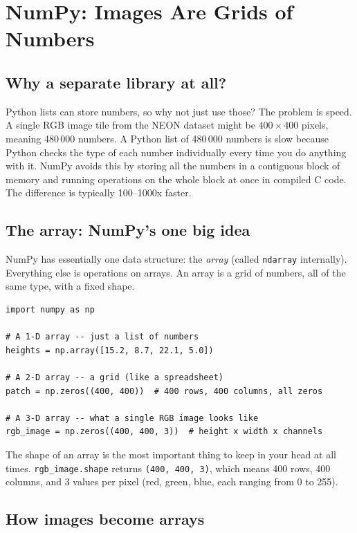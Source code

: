 \documentclass[11pt, a4paper]{article}
\begin{document}
\section{NumPy: Images Are Grids of Numbers}

\subsection{Why a separate library at all?}

Python lists can store numbers, so why not just use those? The problem is
speed. A single RGB image tile from the NEON dataset might be $400 \times 400$
pixels, meaning 480\,000 numbers. A Python list of 480\,000 numbers is slow
because Python checks the type of each number individually every time you do
anything with it. NumPy avoids this by storing all the numbers in a contiguous
block of memory and running operations on the whole block at once in compiled C
code. The difference is typically 100--1000x faster.

\subsection{The array: NumPy's one big idea}

NumPy has essentially one data structure: the \emph{array} (called
\lstinline{ndarray} internally). Everything else is operations on arrays. An
array is a grid of numbers, all of the same type, with a fixed shape.

\begin{lstlisting}
import numpy as np

# A 1-D array -- just a list of numbers
heights = np.array([15.2, 8.7, 22.1, 5.0])

# A 2-D array -- a grid (like a spreadsheet)
patch = np.zeros((400, 400))  # 400 rows, 400 columns, all zeros

# A 3-D array -- what a single RGB image looks like
rgb_image = np.zeros((400, 400, 3))  # height x width x channels
\end{lstlisting}

The shape of an array is the most important thing to keep in your head at all
times. \lstinline{rgb_image.shape} returns \lstinline{(400, 400, 3)}, which
means 400 rows, 400 columns, and 3 values per pixel (red, green, blue, each
ranging from 0 to 255).

\subsection{How images become arrays}
\end{document}
